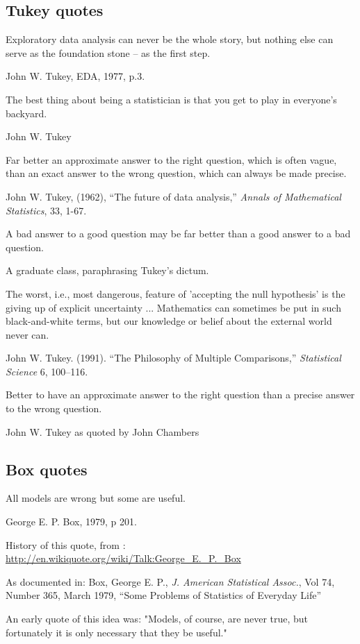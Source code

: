 \subsection{Tukey quotes}

\epigraph{Exploratory data analysis can never be the whole story, but nothing else	can serve as the foundation stone -- as the first step.}{John W. Tukey, EDA, 1977, p.3.}


\epigraph{The best thing about being a statistician is that you get to play in everyone's backyard.}{John W. Tukey}

\epigraph{Far better an approximate answer to the right question, which is often vague, than an exact answer to the wrong question, which can always be made precise.}{John W. Tukey, (1962), ``The future of data analysis,'' \emph{Annals of Mathematical Statistics}, 33, 1-67.}

\epigraph{A bad answer to a good question may be far better than a good answer to a bad question.}{A graduate class, paraphrasing Tukey's dictum.}

\epigraph{The worst, i.e., most dangerous, feature of 'accepting the null hypothesis' is the giving up of explicit uncertainty ... Mathematics can sometimes be put in such black-and-white terms, but our knowledge or belief about the external world never can.}{John W. Tukey. (1991). ``The Philosophy of Multiple Comparisons,'' \emph{Statistical Science} 6, 100--116.}

\epigraph{Better to have an approximate answer to the right question than a precise answer to the wrong question.}{John W. Tukey as quoted by John Chambers}


\subsection{Box quotes}

\epigraph{All models are wrong but some are useful.}{George E. P. Box, 1979, p 201.}

History of this quote, from : \url{http://en.wikiquote.org/wiki/Talk:George_E._P._Box}

As documented in: Box, George E. P., \emph{J. American Statistical Assoc.}, Vol 74, Number 365, March 1979, ``Some Problems of Statistics of Everyday Life''

An early quote of this idea was: "Models, of course, are never true, but fortunately it is only necessary that they be useful."

